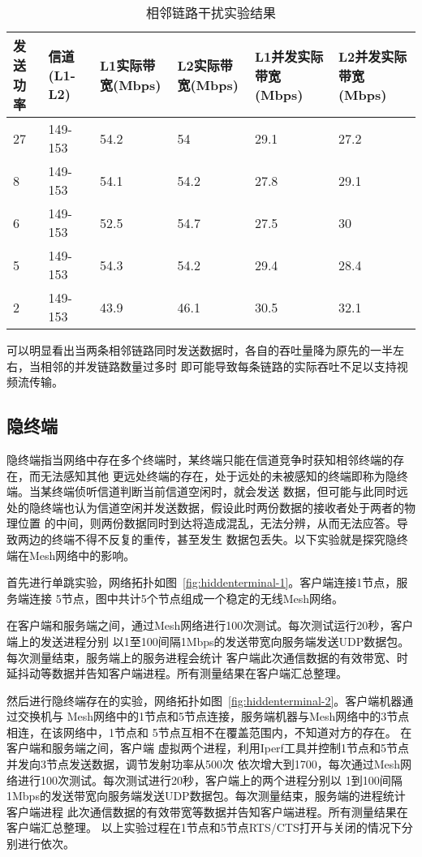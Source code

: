 \begin{table}[htbp]
  \centering
  \caption{相邻链路干扰实验结果}
  \label{tab:interference}
  \begin{tabular}{p{2cm}p{2cm}p{2cm}p{2cm}p{2cm}p{2cm}}
  \hline
  发送功率 & 信道(L1-L2) & L1实际带宽(Mbps) & L2实际带宽(Mbps) & L1并发实际带宽(Mbps) & L2并发实际带宽(Mbps) \\
  \hline
  27 &  149-153 & 54.2 & 54 & 29.1 & 27.2 \\
  8 &  149-153 & 54.1 & 54.2 & 27.8 & 29.1 \\
  6 &  149-153 & 52.5 & 54.7 & 27.5 & 30 \\
  5 &  149-153 & 54.3 & 54.2 & 29.4 & 28.4 \\
  2 &  149-153 & 43.9 & 46.1 & 30.5 & 32.1 \\
  \hline
  \end{tabular}
\end{table}

可以明显看出当两条相邻链路同时发送数据时，各自的吞吐量降为原先的一半左右，当相邻的并发链路数量过多时
即可能导致每条链路的实际吞吐不足以支持视频流传输。

\subsection{隐终端}
隐终端指当网络中存在多个终端时，某终端只能在信道竞争时获知相邻终端的存在，而无法感知其他
更远处终端的存在，处于远处的未被感知的终端即称为隐终端。当某终端侦听信道判断当前信道空闲时，就会发送
数据，但可能与此同时远处的隐终端也认为信道空闲并发送数据，假设此时两份数据的接收者处于两者的物理位置
的中间，则两份数据同时到达将造成混乱，无法分辨，从而无法应答。导致两边的终端不得不反复的重传，甚至发生
数据包丢失。以下实验就是探究隐终端在Mesh网络中的影响。

首先进行单跳实验，网络拓扑如图~\ref{fig:hiddenterminal-1}。客户端连接1节点，服务端连接
5节点，图中共计5个节点组成一个稳定的无线Mesh网络。

在客户端和服务端之间，通过Mesh网络进行100次测试。每次测试运行20秒，客户端上的发送进程分别
以1至100间隔1Mbps的发送带宽向服务端发送UDP数据包。每次测量结束，服务端上的服务进程会统计
客户端此次通信数据的有效带宽、时延抖动等数据并告知客户端进程。所有测量结果在客户端汇总整理。

然后进行隐终端存在的实验，网络拓扑如图~\ref{fig:hiddenterminal-2}。客户端机器通过交换机与
Mesh网络中的1节点和5节点连接，服务端机器与Mesh网络中的3节点相连，在该网络中，1节点和
5节点互相不在覆盖范围内，不知道对方的存在。
在客户端和服务端之间，客户端
虚拟两个进程，利用Iperf工具并控制1节点和5节点并发向3节点发送数据，调节发射功率从500次
依次增大到1700，每次通过Mesh网络进行100次测试。每次测试进行20秒，客户端上的两个进程分别以
1到100间隔1Mbps的发送带宽向服务端发送UDP数据包。每次测量结束，服务端的进程统计客户端进程
此次通信数据的有效带宽等数据并告知客户端进程。所有测量结果在客户端汇总整理。
以上实验过程在1节点和5节点RTS/CTS打开与关闭的情况下分别进行依次。

